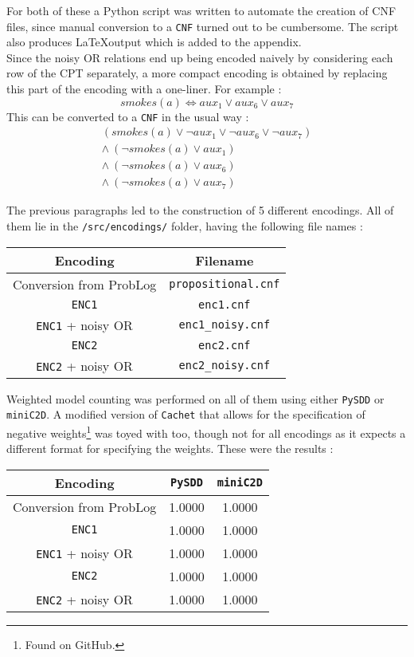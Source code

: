 \begin{multicols*}{2}
\noindent For both of these a Python script was written to automate the creation of CNF files, since manual conversion to a \texttt{CNF} turned out to be cumbersome. The script also produces \LaTeX output which is added to the appendix.\\

\noindent Since the noisy OR relations end up being encoded naively by considering each row of the CPT separately, a more compact encoding is obtained by replacing this part of the encoding with a one-liner. For example :
$$smokes(a)\Leftrightarrow aux_1 \lor aux_6 \lor aux_7$$
\noindent This can be converted to a \texttt{CNF} in the usual way :
\begin{gather*}
(smokes(a) \lor \lnot aux_1\lor\lnot aux_6\lor\lnot aux_7)\\
\land\ (\lnot smokes(a) \lor aux_1)\\
\land\ (\lnot smokes(a) \lor aux_6)\\
\land\ (\lnot smokes(a) \lor aux_7)
\end{gather*}



The previous paragraphs led to the construction of 5 different encodings. All of them lie in the \texttt{/src/encodings/} folder, having the following file names :
\begin{center}
\begin{tabular}{cc}
Encoding & Filename \\\hline
Conversion from ProbLog & \texttt{propositional.cnf}\\
\texttt{ENC1} & \texttt{enc1.cnf}\\
\texttt{ENC1} + noisy OR & \texttt{enc1\_noisy.cnf}\\
\texttt{ENC2} & \texttt{enc2.cnf}\\
\texttt{ENC2} + noisy OR & \texttt{enc2\_noisy.cnf}\\
\end{tabular}
\end{center}
\noindent Weighted model counting was performed on all of them using either \texttt{PySDD} or \texttt{miniC2D}. A modified version of \texttt{Cachet} that allows for the specification of negative weights\footnote{Found on GitHub.} was toyed with too, though not for all encodings as it expects a different format for specifying the weights. These were the results :
\begin{center}
\begin{tabular}{c|cc}
Encoding & \texttt{PySDD} & \texttt{miniC2D} \\\hline
Conversion from ProbLog & 1.0000 & 1.0000\\
\texttt{ENC1} & 1.0000 & 1.0000\\
\texttt{ENC1} + noisy OR & 1.0000 & 1.0000\\
\texttt{ENC2} & 1.0000 & 1.0000\\
\texttt{ENC2} + noisy OR & 1.0000 & 1.0000\\
\end{tabular}
\end{center}


\end{multicols*}
